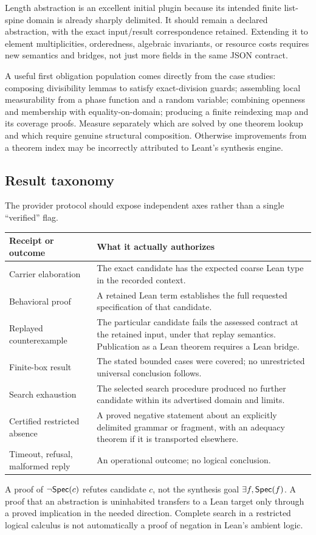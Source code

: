 \documentclass[11pt,letterpaper]{article}
\theoremstyle{definition}\newtheorem{definition}[theorem]{Definition}
\begin{document}
Length abstraction is an excellent initial plugin because its intended finite list-spine domain is already sharply delimited. It should remain a declared abstraction, with the exact input/result correspondence retained. Extending it to element multiplicities, orderedness, algebraic invariants, or resource costs requires new semantics and bridges, not just more fields in the same JSON contract.

A useful first obligation population comes directly from the case studies: composing divisibility lemmas to satisfy exact-division guards; assembling local measurability from a phase function and a random variable; combining openness and membership with equality-on-domain; producing a finite reindexing map and its coverage proofs. Measure separately which are solved by one theorem lookup and which require genuine structural composition. Otherwise improvements from a theorem index may be incorrectly attributed to Leant's synthesis engine.

\subsection{Result taxonomy}
The provider protocol should expose independent axes rather than a single ``verified'' flag.
\begin{center}\small
\begin{tabularx}{\textwidth}{@{}L{1.55in}Y@{}}
\toprule
Receipt or outcome & What it actually authorizes\\\midrule
Carrier elaboration & The exact candidate has the expected coarse Lean type in the recorded context.\\
Behavioral proof & A retained Lean term establishes the full requested specification of that candidate.\\
Replayed counterexample & The particular candidate fails the assessed contract at the retained input, under that replay semantics. Publication as a Lean theorem requires a Lean bridge.\\
Finite-box result & The stated bounded cases were covered; no unrestricted universal conclusion follows.\\
Search exhaustion & The selected search procedure produced no further candidate within its advertised domain and limits.\\
Certified restricted absence & A proved negative statement about an explicitly delimited grammar or fragment, with an adequacy theorem if it is transported elsewhere.\\
Timeout, refusal, malformed reply & An operational outcome; no logical conclusion.\\
\bottomrule
\end{tabularx}
\end{center}
A proof of $\neg\mathsf{Spec}(c)$ refutes candidate $c$, not the synthesis goal $\exists f,\mathsf{Spec}(f)$. A proof that an abstraction is uninhabited transfers to a Lean target only through a proved implication in the needed direction. Complete search in a restricted logical calculus is not automatically a proof of negation in Lean's ambient logic.
\end{document}
